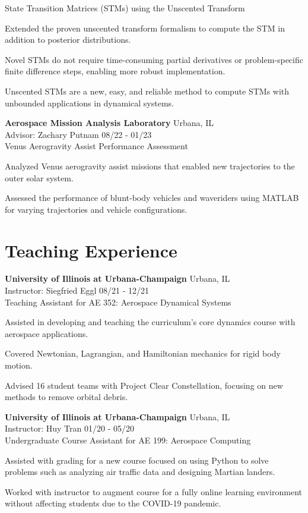 \documentclass[margin,line]{res}
\newlength{\myitemspacing}
\newenvironment{list_new}{
    \begin{list}{\scriptsize{$\bullet$}}{%
        \setlength{\itemsep}{0in}
        \setlength{\parsep}{\myitemspacing} \setlength{\parskip}{0in}
        \setlength{\topsep}{0in} \setlength{\partopsep}{0in} 
        \setlength{\leftmargin}{0.2in}
        }}
    {\end{list}
}
\begin{document}
\begin{resume}
State Transition Matrices (STMs) using the Unscented Transform
\begin{list_new}
    \item Extended the proven unscented transform formalism to compute the STM in addition to posterior distributions.
    \item Novel STMs do not require time-consuming partial derivatives or problem-specific finite difference steps, enabling more robust implementation.
    \item Unscented STMs are a new, easy, and reliable method to compute STMs with unbounded applications in dynamical systems.
\end{list_new}
{\bf Aerospace Mission Analysis Laboratory} \hfill Urbana, IL\\
Advisor: Zachary Putnam \hfill 08/22 - 01/23\\
Venus Aerogravity Assist Performance Assessment
\begin{list_new}
    \item Analyzed Venus aerogravity assist missions that enabled new trajectories to the outer solar system.
    \item Assessed the performance of blunt-body vehicles and waveriders using MATLAB for varying trajectories and vehicle configurations.
\end{list_new}

\section{\sc Teaching Experience}
{\bf University of Illinois at Urbana-Champaign} \hfill Urbana, IL\\
Instructor: Siegfried Eggl \hfill 08/21 - 12/21\\
Teaching Assistant for AE 352: Aerospace Dynamical Systems
\begin{list_new}
    \item Assisted in developing and teaching the curriculum's core dynamics course with aerospace applications.
    \item Covered Newtonian, Lagrangian, and Hamiltonian mechanics for rigid body motion.
    \item Advised 16 student teams with Project Clear Constellation, focusing on new methods to remove orbital debris.
\end{list_new}
{\bf University of Illinois at Urbana-Champaign} \hfill Urbana, IL\\
Instructor: Huy Tran \hfill 01/20 - 05/20\\
Undergraduate Course Assistant for AE 199: Aerospace Computing
\begin{list_new}
    \item Assisted with grading for a new course focused on using Python to solve problems such as analyzing air traffic data and designing Martian landers.
    \item Worked with instructor to augment course for a fully online learning environment without affecting students due to the COVID-19 pandemic.
\end{list_new}


\end{resume}
\end{document}
